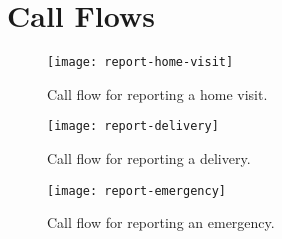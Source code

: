 \chapter{Call Flows}

\begin{figure}[]
	\begin{center}
	\texttt{[image: report-home-visit]}
	\end{center}
	\caption[Home Visit Call Flow]{Call flow for reporting a home visit.}
	\label{fig:homevisit}
\end{figure}


\begin{figure}[]
	\begin{center}
	\texttt{[image: report-delivery]}
	\end{center}
	\caption[Delivery Call Flow]{Call flow for reporting a delivery.}
	\label{fig:delivery}
\end{figure}


\begin{figure}[]
	\begin{center}
	\texttt{[image: report-emergency]}
	\end{center}
	\caption[Emergency Call Flow]{Call flow for reporting an emergency.}
	\label{fig:emergency}
\end{figure}